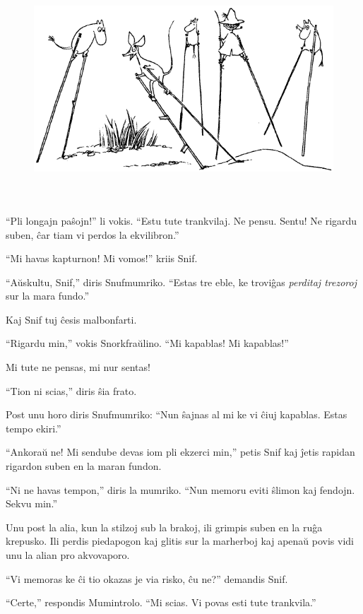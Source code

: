 \begin{figure}[htbp]
\centering
\includegraphics[width=430pt,height=238pt]{7-3.png}
\caption{}
\label{7-3}
\end{figure}

``Pli longajn paŝojn!'' li vokis. ``Estu tute trankvilaj. Ne pensu. Sentu! Ne rigardu suben, ĉar tiam vi perdos la ekvilibron.''

``Mi havas kapturnon! Mi vomos!'' kriis Snif.

``Aŭskultu, Snif,'' diris Snufmumriko. ``Estas tre eble, ke troviĝas \emph{perditaj trezoroj} sur la mara fundo.''

Kaj Snif tuj ĉesis malbonfarti.

``Rigardu min,'' vokis Snorkfraŭlino. ``Mi kapablas! Mi kapablas!''

Mi tute ne pensas, mi nur sentas!

``Tion ni scias,'' diris ŝia frato.

Post unu horo diris Snufmumriko: ``Nun ŝajnas al mi ke vi ĉiuj kapablas. Estas tempo ekiri.''

``Ankoraŭ ne! Mi sendube devas iom pli ekzerci min,'' petis Snif kaj ĵetis rapidan rigardon suben en la maran fundon.

``Ni ne havas tempon,'' diris la mumriko. ``Nun memoru eviti ŝlimon kaj fendojn. Sekvu min.''

Unu post la alia, kun la stilzoj sub la brakoj, ili grimpis suben en la ruĝa krepusko. Ili perdis piedapogon kaj glitis sur la marherboj kaj apenaŭ povis vidi unu la alian pro akvovaporo.

``Vi memoras ke ĉi tio okazas je via risko, ĉu ne?'' demandis Snif.

``Certe,'' respondis Mumintrolo. ``Mi scias. Vi povas esti tute trankvila.''

